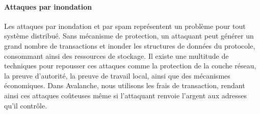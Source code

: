 \documentclass[letterpaper,twocolumn,10pt]{article}
\theoremstyle{definition}
\begin{document}

\paragraph{Attaques par inondation}
Les attaques par inondation et par spam représentent un problème pour tout système distribué.
Sans mécanisme de protection, un attaquant peut générer un grand nombre de transactions et inonder les structures de données du protocole, consommant ainsi des ressources de stockage.
Il existe une multitude de techniques pour repousser ces attaques comme la protection de la couche réseau, la preuve d'autorité, la preuve de travail local, ainsi que des mécanismes économiques.
Dans Avalanche, nous utilisons les frais de transaction, rendant ainsi ces attaques coûteuses même si l'attaquant renvoie l'argent aux adresses qu'il contrôle.



\end{document}
